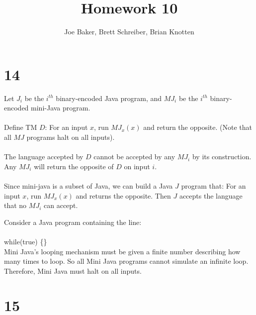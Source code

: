 \documentclass[letterpaper,notitlepage,twoside]{article}
\begin{document}
\title{Homework 10}
\author{Joe Baker, Brett Schreiber, Brian Knotten}
\maketitle

\section*{14}
Let $J_i$ be the $i^{th}$ binary-encoded Java program, and $MJ_i$ be the $i^{th}$ binary-encoded mini-Java program.
\\\\
Define TM $D$:
For an input $x$, run $MJ_x(x)$ and return the opposite. (Note that all $MJ$ programs halt on all inputs).
\\\\
The language accepted by $D$ cannot be accepted by any $MJ_i$ by its construction. Any $MJ_i$ will return the opposite of $D$ on input $i$.
\\\\
Since mini-java is a subset of Java, we can build a Java $J$ program that: For an input $x$, run $MJ_x(x)$ and returns the opposite. Then $J$ accepts the language that no $MJ_i$ can accept.

Consider a Java program containing the line: \\\\
while(true) \{\} \\

Mini Java's looping mechanism must be given a finite number describing how many times to loop. So all Mini Java programs cannot simulate an infinite loop. Therefore, Mini Java must halt on all inputs.\\

\section*{15}
\end{document}
